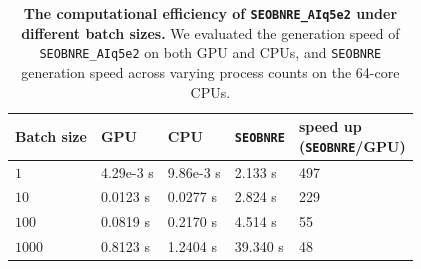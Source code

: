 \documentclass[
reprint,
superscriptaddress,
amsmath,amssymb,
aps,
prd,
floatfix,
]{revtex4-2}
\begin{document}
\begin{table}
\caption{
\textbf{The computational efficiency of \texttt{SEOBNRE\_AIq5e2} under different batch sizes.} We evaluated the generation speed of \texttt{SEOBNRE\_AIq5e2} on both GPU and CPUs, and \texttt{SEOBNRE} generation speed across varying process counts on the 64-core CPUs.
}
\label{tab:3}
\centering
\begin{threeparttable}
    \begin{tabular}{p{2cm}<{\centering}p{2cm}<{\centering}p{2cm}<{\centering}p{2cm}<{\centering}p{3cm}<{\centering}}
        \toprule
        Batch size   & GPU & CPU & \texttt{SEOBNRE} & \thead{speed up\\(\texttt{SEOBNRE}/GPU)}\\
        \midrule
        $1$    & 4.29e-3 s & 9.86e-3 s & 2.133 s  & 497\\
        $10$   & 0.0123 s  & 0.0277 s  & 2.824 s  & 229\\
        $100$ & 0.0819 s  & 0.2170 s  & 4.514 s  & 55\\
        $1000$ & 0.8123 s  & 1.2404 s  & 39.340 s & 48\\
        \bottomrule
    \end{tabular}
\end{threeparttable}
\end{table}

\end{document}
